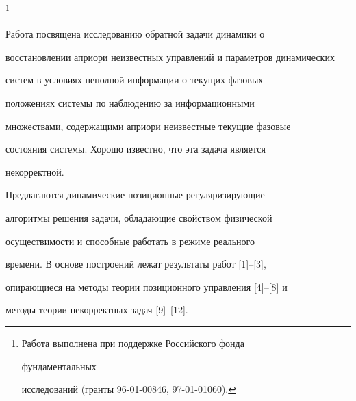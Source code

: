  


\thanks{Работа выполнена при поддержке Российского фонда 


фундаментальных 


исследований (гранты 96-01-00846, 97-01-01060).} 


\date{} 




 


\pagestyle{plain} %


 


 




 


\maketitle 


\label{begin} 


 


 


Работа посвящена исследованию обратной задачи динамики о 


восстановлении априори неизвестных управлений и параметров динамических 


систем в условиях неполной информации о текущих фазовых 


положениях системы по наблюдению за информационными 


множествами, содержащими априори неизвестные текущие фазовые 


состояния системы. Хорошо известно, что эта задача является 


некорректной. 


Предлагаются динамические позиционные регуляризирующие 


алгоритмы решения задачи, обладающие свойством физической 


осуществимости и способные работать в режиме реального 


времени. В основе построений лежат результаты работ [1]--[3], 


опирающиеся на методы теории позиционного управления [4]--[8] и 


методы теории некорректных задач [9]--[12]. 


